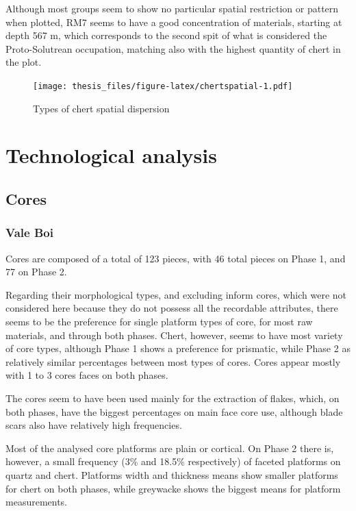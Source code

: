 \documentclass[12pt,twoside]{reedthesis}
\begin{document}
Although most groups seem to show no particular spatial restriction or pattern when plotted, RM7 seems to have a good concentration of materials, starting at depth 567 m, which corresponds to the second spit of what is considered the Proto-Solutrean occupation, matching also with the highest quantity of chert in the plot.
\begin{figure}
\centering
\texttt{[image: thesis\_files/figure-latex/chertspatial-1.pdf]}
\caption{\label{fig:chertspatial}Types of chert spatial dispersion}
\end{figure}
\hypertarget{technological-analysis}{%
\section{Technological analysis}\label{technological-analysis}}

\hypertarget{cores}{%
\subsection{Cores}\label{cores}}

\hypertarget{vale-boi-2}{%
\subsubsection{Vale Boi}\label{vale-boi-2}}

Cores are composed of a total of 123 pieces, with 46 total pieces on Phase 1, and 77 on Phase 2.

Regarding their morphological types, and excluding inform cores, which were not considered here because they do not possess all the recordable attributes, there seems to be the preference for single platform types of core, for most raw materials, and through both phases. Chert, however, seems to have most variety of core types, although Phase 1 shows a preference for prismatic, while Phase 2 as relatively similar percentages between most types of cores. Cores appear mostly with 1 to 3 cores faces on both phases.

The cores seem to have been used mainly for the extraction of flakes, which, on both phases, have the biggest percentages on main face core use, although blade scars also have relatively high frequencies.

Most of the analysed core platforms are plain or cortical. On Phase 2 there is, however, a small frequency (3\% and 18.5\% respectively) of faceted platforms on quartz and chert. Platforms width and thickness means show smaller platforms for chert on both phases, while greywacke shows the biggest means for platform measurements.
\end{document}
